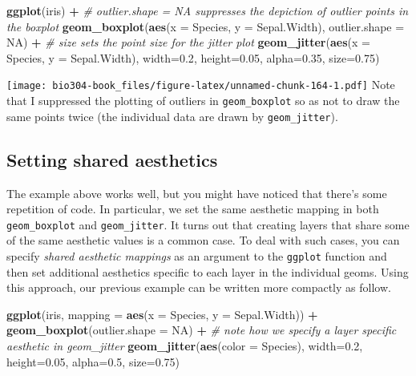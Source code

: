 \documentclass[]{book}
\newenvironment{Shaded}{\begin{snugshade}}{\end{snugshade}}
\newcommand{\CommentTok}[1]{\textcolor[rgb]{0.56,0.35,0.01}{\textit{#1}}}
\newcommand{\DataTypeTok}[1]{\textcolor[rgb]{0.13,0.29,0.53}{#1}}
\newcommand{\FloatTok}[1]{\textcolor[rgb]{0.00,0.00,0.81}{#1}}
\newcommand{\KeywordTok}[1]{\textcolor[rgb]{0.13,0.29,0.53}{\textbf{#1}}}
\newcommand{\NormalTok}[1]{#1}
\newcommand{\OperatorTok}[1]{\textcolor[rgb]{0.81,0.36,0.00}{\textbf{#1}}}
\newcommand{\OtherTok}[1]{\textcolor[rgb]{0.56,0.35,0.01}{#1}}
\newcommand{\StringTok}[1]{\textcolor[rgb]{0.31,0.60,0.02}{#1}}
\theoremstyle{definition}
\theoremstyle{definition}
\theoremstyle{definition}
\theoremstyle{remark}
\begin{document}
\begin{Shaded}
\begin{Highlighting}[]
\KeywordTok{ggplot}\NormalTok{(iris) }\OperatorTok{+}
\StringTok{  }\CommentTok{# outlier.shape = NA suppresses the depiction of outlier points in the boxplot}
\StringTok{  }\KeywordTok{geom_boxplot}\NormalTok{(}\KeywordTok{aes}\NormalTok{(}\DataTypeTok{x =}\NormalTok{ Species, }\DataTypeTok{y =}\NormalTok{ Sepal.Width), }\DataTypeTok{outlier.shape =} \OtherTok{NA}\NormalTok{) }\OperatorTok{+}\StringTok{ }
\StringTok{  }\CommentTok{# size sets the point size for the jitter plot}
\StringTok{  }\KeywordTok{geom_jitter}\NormalTok{(}\KeywordTok{aes}\NormalTok{(}\DataTypeTok{x =}\NormalTok{ Species, }\DataTypeTok{y =}\NormalTok{ Sepal.Width), }\DataTypeTok{width=}\FloatTok{0.2}\NormalTok{, }\DataTypeTok{height=}\FloatTok{0.05}\NormalTok{, }\DataTypeTok{alpha=}\FloatTok{0.35}\NormalTok{, }\DataTypeTok{size=}\FloatTok{0.75}\NormalTok{)}
\end{Highlighting}
\end{Shaded}

\texttt{[image: bio304-book\_files/figure-latex/unnamed-chunk-164-1.pdf]}
Note that I suppressed the plotting of outliers in
\texttt{geom\_boxplot} so as not to draw the same points twice (the
individual data are drawn by \texttt{geom\_jitter}).

\hypertarget{setting-shared-aesthetics}{%
\subsection{Setting shared aesthetics}\label{setting-shared-aesthetics}}

The example above works well, but you might have noticed that there's
some repetition of code. In particular, we set the same aesthetic
mapping in both \texttt{geom\_boxplot} and \texttt{geom\_jitter}. It
turns out that creating layers that share some of the same aesthetic
values is a common case. To deal with such cases, you can specify
\emph{shared aesthetic mappings} as an argument to the \texttt{ggplot}
function and then set additional aesthetics specific to each layer in
the individual geoms. Using this approach, our previous example can be
written more compactly as follow.

\begin{Shaded}
\begin{Highlighting}[]
\KeywordTok{ggplot}\NormalTok{(iris, }\DataTypeTok{mapping =} \KeywordTok{aes}\NormalTok{(}\DataTypeTok{x =}\NormalTok{ Species, }\DataTypeTok{y =}\NormalTok{ Sepal.Width)) }\OperatorTok{+}
\StringTok{  }\KeywordTok{geom_boxplot}\NormalTok{(}\DataTypeTok{outlier.shape =} \OtherTok{NA}\NormalTok{) }\OperatorTok{+}\StringTok{ }
\StringTok{  }\CommentTok{# note how we specify a layer specific aesthetic in geom_jitter}
\StringTok{  }\KeywordTok{geom_jitter}\NormalTok{(}\KeywordTok{aes}\NormalTok{(}\DataTypeTok{color =}\NormalTok{ Species), }\DataTypeTok{width=}\FloatTok{0.2}\NormalTok{, }\DataTypeTok{height=}\FloatTok{0.05}\NormalTok{, }\DataTypeTok{alpha=}\FloatTok{0.5}\NormalTok{, }\DataTypeTok{size=}\FloatTok{0.75}\NormalTok{)}
\end{Highlighting}
\end{Shaded}
\end{document}
